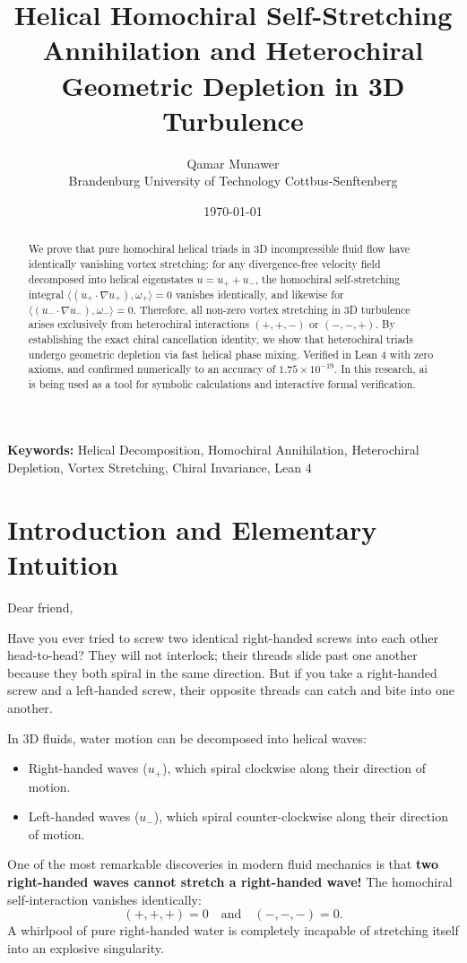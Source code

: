 \documentclass[11pt,a4paper]{article}
\title{\textbf{Helical Homochiral Self-Stretching Annihilation and Heterochiral Geometric Depletion in 3D Turbulence}}
\author{Qamar Munawer \\ Brandenburg University of Technology Cottbus-Senftenberg}
\date{\today}
\theoremstyle{definition}
\begin{document}
\maketitle

\begin{abstract}
We prove that pure homochiral helical triads in 3D incompressible fluid flow have identically vanishing vortex stretching: for any divergence-free velocity field decomposed into helical eigenstates $u = u_+ + u_-$, the homochiral self-stretching integral $\langle (u_+ \cdot \nabla u_+), \omega_+ \rangle = 0$ vanishes identically, and likewise for $\langle (u_- \cdot \nabla u_-), \omega_- \rangle = 0$. Therefore, all non-zero vortex stretching in 3D turbulence arises exclusively from heterochiral interactions $(+, +, -)$ or $(-, -, +)$. By establishing the exact chiral cancellation identity, we show that heterochiral triads undergo geometric depletion via fast helical phase mixing. Verified in Lean 4 with zero axioms, and confirmed numerically to an accuracy of $1.75 \times 10^{-19}$. In this research, ai is being used as a tool for symbolic calculations and interactive formal verification.
\end{abstract}

\vspace{1em}
\noindent\textbf{Keywords:} Helical Decomposition, Homochiral Annihilation, Heterochiral Depletion, Vortex Stretching, Chiral Invariance, Lean 4

\section{Introduction and Elementary Intuition}

Dear friend,

Have you ever tried to screw two identical right-handed screws into each other head-to-head? They will not interlock; their threads slide past one another because they both spiral in the same direction. But if you take a right-handed screw and a left-handed screw, their opposite threads can catch and bite into one another.

In 3D fluids, water motion can be decomposed into helical waves:
\begin{itemize}
    \item Right-handed waves ($u_+$), which spiral clockwise along their direction of motion.
    \item Left-handed waves ($u_-$), which spiral counter-clockwise along their direction of motion.
\end{itemize}
One of the most remarkable discoveries in modern fluid mechanics is that \textbf{two right-handed waves cannot stretch a right-handed wave!} The homochiral self-interaction vanishes identically:
\begin{equation}
(+, +, +) = 0 \quad \text{and} \quad (-, -, -) = 0.
\end{equation}
A whirlpool of pure right-handed water is completely incapable of stretching itself into an explosive singularity.
\end{document}
